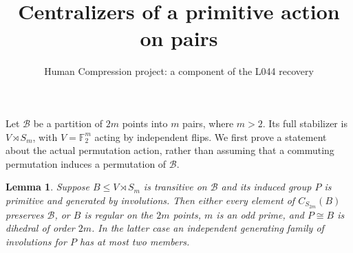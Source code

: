 \documentclass[11pt,a4paper]{article}
\title{Centralizers of a primitive action on pairs}
\author{Human Compression project: a component of the L044 recovery}
\date{}
\newtheorem{lemma}{Lemma}
\begin{document}
\maketitle
Let $\mathcal B$ be a partition of $2m$ points into $m$ pairs,
where $m>2$. Its full stabilizer is $V\rtimes S_m$, with
$V=\mathbb F_2^m$ acting by independent flips. We first prove
a statement about the actual permutation action, rather than
assuming that a commuting permutation induces a permutation of
$\mathcal B$.

\begin{lemma}\label{centralizer}
Suppose $B\le V\rtimes S_m$ is transitive on $\mathcal B$
and its induced group $P$ is primitive and generated by
involutions. Then either every element of $C_{S_{2m}}(B)$
preserves $\mathcal B$, or $B$ is regular on the $2m$ points,
$m$ is an odd prime, and $P\cong B$ is dihedral of order $2m$.
In the latter case an independent generating family of
involutions for $P$ has at most two members.
\end{lemma}
\end{document}
